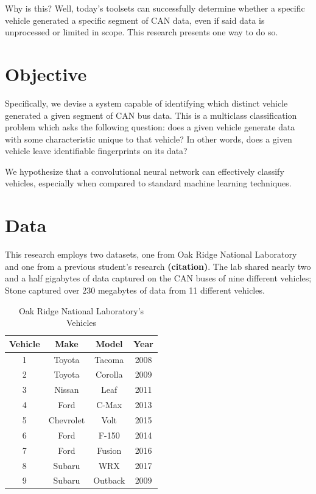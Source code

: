 \documentclass[10pt]{article}
\newcommand{\newpar}{\medskip \noindent}
\begin{document}
\newpar Why is this? Well, today's toolsets can successfully determine whether a specific vehicle generated a specific segment of CAN data, even if said data is unprocessed or limited in scope. This research presents one way to do so.

\section{Objective}

\newpar Specifically, we devise a system capable of identifying which distinct vehicle generated a given segment of CAN bus data. This is a multiclass classification problem which asks the following question: does a given vehicle generate data with some characteristic unique to that vehicle? In other words, does a given vehicle leave identifiable fingerprints on its data?

\newpar We hypothesize that a convolutional neural network can effectively classify vehicles, especially when compared to standard machine learning techniques.

\section{Data}

\newpar This research employs two datasets, one from Oak Ridge National Laboratory and one from a previous student's research \textbf{(citation)}. The lab shared nearly two and a half gigabytes of data captured on the CAN buses of nine different vehicles; Stone captured over 230 megabytes of data from 11 different vehicles.

\begin{table}
    \caption*{Oak Ridge National Laboratory's Vehicles}
    \centering
    \begin{tabular}{|c|c|c|c|}
    \hline
    \textbf{Vehicle} & \textbf{Make} & \textbf{Model} & \textbf{Year} \\
    \hline
    1   & Toyota    & Tacoma    & 2008 \\
    2   & Toyota    & Corolla   & 2009 \\
    3   & Nissan    & Leaf      & 2011 \\
    4   & Ford      & C-Max     & 2013 \\
    5   & Chevrolet & Volt      & 2015 \\
    6   & Ford      & F-150     & 2014 \\
    7   & Ford      & Fusion    & 2016 \\
    8   & Subaru    & WRX       & 2017 \\
    9   & Subaru    & Outback   & 2009 \\
    \hline
    \end{tabular}
\end{table}
\end{document}
